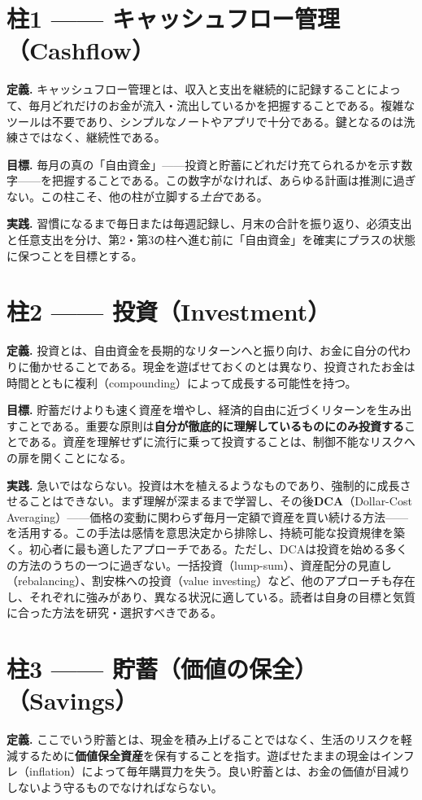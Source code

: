 \documentclass[11pt,a4paper,twocolumn]{article}
\begin{document}
\section{柱1 —— キャッシュフロー管理（Cashflow）}
\textbf{定義.} キャッシュフロー管理とは、収入と支出を継続的に記録することによって、毎月どれだけのお金が流入・流出しているかを把握することである。複雑なツールは不要であり、シンプルなノートやアプリで十分である。鍵となるのは洗練さではなく、継続性である。

\textbf{目標.} 毎月の真の「自由資金」——投資と貯蓄にどれだけ充てられるかを示す数字——を把握することである。この数字がなければ、あらゆる計画は推測に過ぎない。この柱こそ、他の柱が立脚する\textit{土台}である。

\textbf{実践.} 習慣になるまで毎日または毎週記録し、月末の合計を振り返り、必須支出と任意支出を分け、第2・第3の柱へ進む前に「自由資金」を確実にプラスの状態に保つことを目標とする。

\section{柱2 —— 投資（Investment）}
\textbf{定義.} 投資とは、自由資金を長期的なリターンへと振り向け、お金に自分の代わりに働かせることである。現金を遊ばせておくのとは異なり、投資されたお金は時間とともに複利（compounding）によって成長する可能性を持つ。

\textbf{目標.} 貯蓄だけよりも速く資産を増やし、経済的自由に近づくリターンを生み出すことである。重要な原則は\textbf{自分が徹底的に理解しているものにのみ投資する}ことである。資産を理解せずに流行に乗って投資することは、制御不能なリスクへの扉を開くことになる。

\textbf{実践.} 急いではならない。投資は木を植えるようなものであり、強制的に成長させることはできない。まず理解が深まるまで学習し、その後\textbf{DCA}（Dollar-Cost Averaging）——価格の変動に関わらず毎月一定額で資産を買い続ける方法——を活用する。この手法は感情を意思決定から排除し、持続可能な投資規律を築く。初心者に最も適したアプローチである。ただし、DCAは投資を始める多くの方法のうちの一つに過ぎない。一括投資（lump-sum）、資産配分の見直し（rebalancing）、割安株への投資（value investing）など、他のアプローチも存在し、それぞれに強みがあり、異なる状況に適している。読者は自身の目標と気質に合った方法を研究・選択すべきである。

\section{柱3 —— 貯蓄（価値の保全）（Savings）}
\textbf{定義.} ここでいう貯蓄とは、現金を積み上げることではなく、生活のリスクを軽減するために\textbf{価値保全資産}を保有することを指す。遊ばせたままの現金はインフレ（inflation）によって毎年購買力を失う。良い貯蓄とは、お金の価値が目減りしないよう守るものでなければならない。
\end{document}
